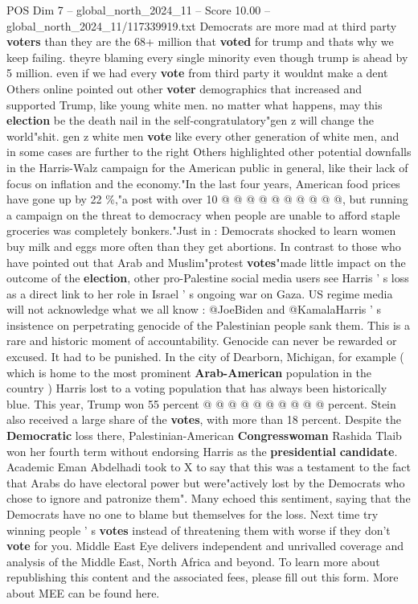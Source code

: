 \begin{textsample}{POS Dim 7 – global\_north\_2024\_11 – Score 10.00 – global\_north\_2024\_11/117339919.txt}
Democrats are more mad at third party \textbf{voters} than they are the 68+ million that \textbf{voted} for trump and thats why we keep failing. theyre blaming every single minority even though trump is ahead by 5 million. even if we had every \textbf{vote} from third party it wouldnt make a dent Others online pointed out other \textbf{voter} demographics that increased and supported Trump, like young white men. no matter what happens, may this \textbf{election} be the death nail in the self-congratulatory"gen z will change the world"shit. gen z white men \textbf{vote} like every other generation of white men, and in some cases are further to the right Others highlighted other potential downfalls in the Harris-Walz campaign for the American public in general, like their lack of focus on inflation and the economy."In the last four years, American food prices have gone up by 22 \%,"a post with over 10 @ @ @ @ @ @ @ @ @ @, but running a campaign on the threat to democracy when people are unable to afford staple groceries was completely bonkers."Just in : Democrats shocked to learn women buy milk and eggs more often than they get abortions.
In contrast to those who have pointed out that Arab and Muslim"protest \textbf{votes}"made little impact on the outcome of the \textbf{election}, other pro-Palestine social media users see Harris ' s loss as a direct link to her role in Israel ' s ongoing war on Gaza.
US regime media will not acknowledge what we all know : @JoeBiden and @KamalaHarris ' s insistence on perpetrating genocide of the Palestinian people sank them.
This is a rare and historic moment of accountability.
Genocide can never be rewarded or excused.
It had to be punished.
In the city of Dearborn, Michigan, for example ( which is home to the most prominent \textbf{Arab-American} population in the country ) Harris lost to a voting population that has always been historically blue.
This year, Trump won 55 percent @ @ @ @ @ @ @ @ @ @ percent.
Stein also received a large share of the \textbf{votes}, with more than 18 percent.
Despite the \textbf{Democratic} loss there, Palestinian-American \textbf{Congresswoman} Rashida Tlaib won her fourth term without endorsing Harris as the \textbf{presidential} \textbf{candidate}.
Academic Eman Abdelhadi took to X to say that this was a testament to the fact that Arabs do have electoral power but were"actively lost by the Democrats who chose to ignore and patronize them".
Many echoed this sentiment, saying that the Democrats have no one to blame but themselves for the loss.
Next time try winning people ' s \textbf{votes} instead of threatening them with worse if they don't \textbf{vote} for you.
Middle East Eye delivers independent and unrivalled coverage and analysis of the Middle East, North Africa and beyond.
To learn more about republishing this content and the associated fees, please fill out this form.
More about MEE can be found here.

\end{textsample}
